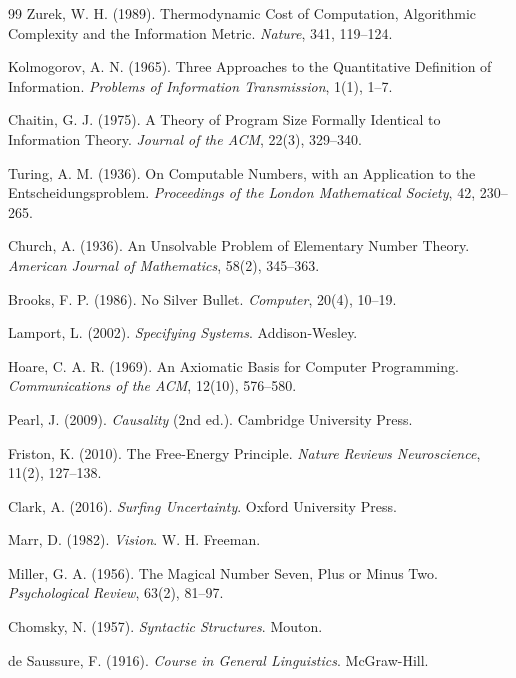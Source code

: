 \documentclass[11pt,oneside]{book}
\theoremstyle{plain}
\theoremstyle{definition}
\theoremstyle{remark}
\begin{document}
\begin{thebibliography}{99}
Zurek, W. H. (1989).
\newblock Thermodynamic Cost of Computation, Algorithmic Complexity and the Information Metric.
\newblock
\emph{Nature}, 341, 119--124.

Kolmogorov, A. N. (1965).
\newblock Three Approaches to the Quantitative Definition of Information.
\newblock
\emph{Problems of Information Transmission}, 1(1), 1--7.

Chaitin, G. J. (1975).
\newblock A Theory of Program Size Formally Identical to Information Theory.
\newblock
\emph{Journal of the ACM}, 22(3), 329--340.

Turing, A. M. (1936).
\newblock On Computable Numbers, with an Application to the Entscheidungsproblem.
\newblock
\emph{Proceedings of the London Mathematical Society}, 42, 230--265.

Church, A. (1936).
\newblock An Unsolvable Problem of Elementary Number Theory.
\newblock
\emph{American Journal of Mathematics}, 58(2), 345--363.

Brooks, F. P. (1986).
\newblock No Silver Bullet.
\newblock
\emph{Computer}, 20(4), 10--19.

Lamport, L. (2002).
\newblock
\emph{Specifying Systems}.
\newblock Addison-Wesley.

Hoare, C. A. R. (1969).
\newblock An Axiomatic Basis for Computer Programming.
\newblock
\emph{Communications of the ACM}, 12(10), 576--580.

Pearl, J. (2009).
\newblock
\emph{Causality} (2nd ed.).
\newblock Cambridge University Press.

Friston, K. (2010).
\newblock The Free-Energy Principle.
\newblock
\emph{Nature Reviews Neuroscience}, 11(2), 127--138.

Clark, A. (2016).
\newblock
\emph{Surfing Uncertainty}.
\newblock Oxford University Press.

Marr, D. (1982).
\newblock
\emph{Vision}.
\newblock W. H. Freeman.

Miller, G. A. (1956).
\newblock The Magical Number Seven, Plus or Minus Two.
\newblock
\emph{Psychological Review}, 63(2), 81--97.

Chomsky, N. (1957).
\newblock
\emph{Syntactic Structures}.
\newblock Mouton.

de Saussure, F. (1916).
\newblock
\emph{Course in General Linguistics}.
\newblock McGraw-Hill.


\end{thebibliography}
\end{document}
